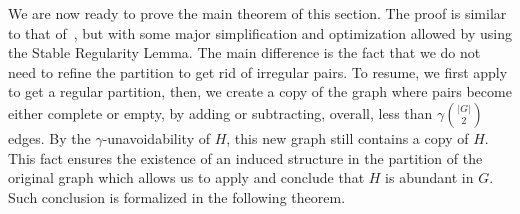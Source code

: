         We are now ready to prove the main theorem of this section.
        The proof is similar to that of~\cite[Theorem~5.1]{efficient_testing_of_large_graphs},
        but with some major simplification and optimization allowed by using the Stable Regularity Lemma.
        The main difference is the fact that we do not need to refine the partition to get rid of irregular pairs.
        To resume, we first apply  to get a regular partition,
        then, we create a copy of the graph where pairs become either complete or empty, by adding or subtracting,
        overall, less than $\gamma {|G| \choose 2}$ edges.
        By the $\gamma$-unavoidability of $H$, this new graph still contains a copy of $H$.
        This fact ensures the existence of an induced structure in the partition of the original graph which allows
        us to apply  and conclude that $H$ is abundant in $G$.
        Such conclusion is formalized in the following theorem.


